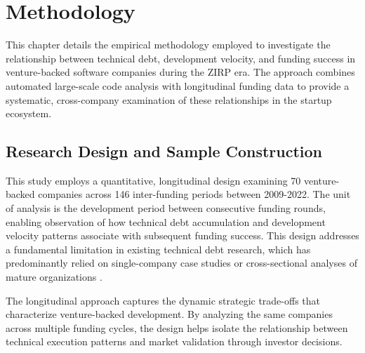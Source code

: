 \chapter{Methodology}\label{sec:methodology}

This chapter details the empirical methodology employed to investigate the relationship between technical debt, development velocity, and funding success in venture-backed software companies during the \ac{ZIRP} era. The approach combines automated large-scale code analysis with longitudinal funding data to provide a systematic, cross-company examination of these relationships in the startup ecosystem.

\section{Research Design and Sample Construction}\label{sec:research_design}

This study employs a quantitative, longitudinal design examining 70 venture-backed companies across 146 inter-funding periods between 2009-2022. The unit of analysis is the development period between consecutive funding rounds, enabling observation of how technical debt accumulation and development velocity patterns associate with subsequent funding success. This design addresses a fundamental limitation in existing technical debt research, which has predominantly relied on single-company case studies or cross-sectional analyses of mature organizations \cite{li2015systematic}.

The longitudinal approach captures the dynamic strategic trade-offs that characterize venture-backed development. By analyzing the same companies across multiple funding cycles, the design helps isolate the relationship between technical execution patterns and market validation through investor decisions.

